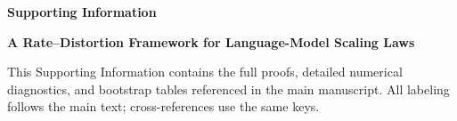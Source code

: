 \documentclass[12pt]{article}
\theoremstyle{remark}
\begin{document}
\begin{center}{\LARGE\bf Supporting Information}\end{center}
\begin{center}{\large\bf A Rate--Distortion Framework for Language-Model Scaling Laws}\end{center}
\doublespacing

This Supporting Information contains the full proofs, detailed numerical
diagnostics, and bootstrap tables referenced in the main manuscript.  All
labeling follows the main text; cross-references use the same keys.



\end{document}
